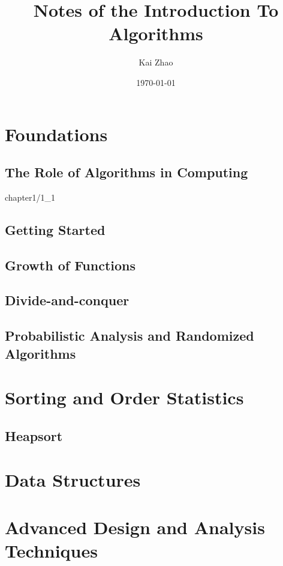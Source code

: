 \documentclass [11pt]{book}
\title {Notes of the Introduction To Algorithms}
\author {Kai Zhao}
\date {\today}
\begin{document}
\maketitle

\tableofcontents


\part {Foundations}

\chapter {The Role of Algorithms in Computing}

 {chapter1/1_1}

\chapter {Getting Started}
\chapter {Growth of Functions}
\chapter {Divide-and-conquer}
\chapter {Probabilistic Analysis and Randomized Algorithms}


\part {Sorting and Order Statistics}

\chapter {Heapsort}


\part {Data Structures}


\part {Advanced Design and Analysis Techniques}
\end{document}

